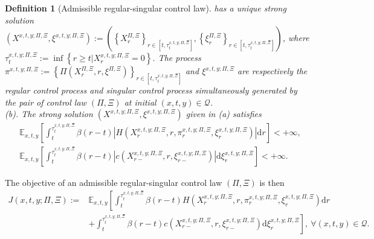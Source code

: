 \documentclass[11pt,reqno]{article}%
\newtheorem{definition}[theorem]{Definition}
\numberwithin{equation}{section}
\begin{document}
\begin{definition}[Admissible regular-singular control law]
has a unique strong solution $\left(X^{x,t,y;\Pi,\Xi},\xi^{x,t,y;\Pi,\Xi}\right):=\left(\left\{X^{\Pi,\Xi}_{r}\right\}_{r\in [t,\tau^{x,t,y;\Pi,\Xi}_{t}]},\left\{\xi^{\Pi,\Xi}_{r}\right\}_{r\in [t,\tau^{x,t,y;\Pi,\Xi}_{t}]}\right)$, where $\tau^{x,t,y;\Pi,\Xi}_{t}:=\inf\left\{r\ge t|X^{x,t,y;\Pi,\Xi}_{r}= 0\right\}$. The process $\pi^{x,t,y;\Pi,\Xi}:=\left\{\Pi\left(X^{\Pi,\Xi}_{r},r,\xi^{\Pi,\Xi}\right)\right\}_{r\in [t,\tau^{x,t,y;\Pi,\Xi}_{t}]}$ and $\xi^{x,t,y;\Pi,\Xi}$ are respectively the regular control process and singular control process simultaneously generated by the pair of control law $(\Pi,\Xi)$ at initial $(x,t,y)\in\mathcal{Q}$.\\
(b). The strong solution $\left(X^{x,t,y;\Pi,\Xi},\xi^{x,t,y;\Pi,\Xi}\right)$ given in (a) satisfies 
\begin{equation}
\begin{aligned}
&\mathbb{E}_{x, t, y}\left[\int_t^{\tau^{x,t,y;\Pi,\Xi}_{t}} \beta(r-t) \left|H\left(X^{x,t,y;\Pi,\Xi}_r, r, \pi^{x,t,y;\Pi,\Xi}_r, \xi^{x,t,y;\Pi,\Xi}_r \right)\right| \mathrm{d} r\right]<+\infty, \\
&\mathbb{E}_{x, t, y}\left[\int_t^{\tau^{x,t,y;\Pi,\Xi}_{t}} \beta(r-t) \left|c\left(X^{x,t,y;\Pi,\Xi}_{r-}, r, \xi^{x,t,y;\Pi,\Xi}_{r-}\right)\right| \mathrm{d} \xi^{x,t,y;\Pi,\Xi}_r\right]<+\infty.
\end{aligned}\nonumber
\end{equation}
\end{definition}

The objective of an admissible regular-singular control law $(\Pi,\Xi)$ is then 
\begin{equation}
\begin{aligned}
J(x,t,y;\Pi,\Xi):=&\mathbb{E}_{x,t,y}\left[\int_t^{\tau^{x,t,y;\Pi,\Xi}_{t}} \beta(r-t) H\left(X^{x,t,y;\Pi,\Xi}_r, r, \pi^{x,t,y;\Pi,\Xi}_r, \xi^{x,t,y;\Pi,\Xi}_r \right) \mathrm{d} r\right. \\
& \left.+\int_t^{\tau^{x,t,y;\Pi,\Xi}_{t}} \beta(r-t) c\left(X^{x,t,y;\Pi,\Xi}_{r-}, r, \xi^{x,t,y;\Pi,\Xi}_{r-}\right) \mathrm{d} \xi^{x,t,y;\Pi,\Xi}_r \right],\ \forall (x,t,y)\in\mathcal{Q}.
\end{aligned}\label{objective}
\end{equation}
\end{document}
